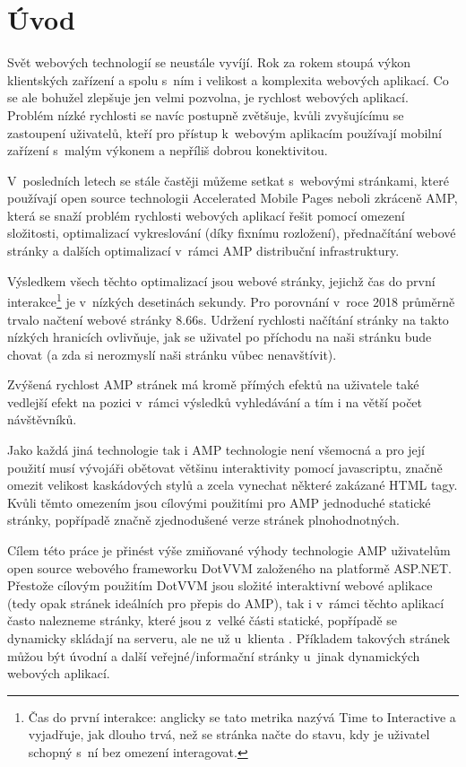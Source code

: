 \chapter{Úvod}

Svět webových technologií se neustále vyvíjí. Rok za rokem stoupá výkon klientských zařízení a spolu
s~ním i velikost a komplexita webových aplikací. Co se ale bohužel zlepšuje jen velmi pozvolna, je rychlost
webových aplikací. Problém nízké rychlosti se navíc postupně zvětšuje, kvůli zvyšujícímu se zastoupení
uživatelů, kteří pro přístup k~webovým aplikacím používají mobilní zařízení s~malým výkonem a nepříliš
dobrou konektivitou.

V~posledních letech se stále častěji můžeme setkat s~webovými stránkami, které používají open source technologii Accelerated Mobile Pages neboli zkráceně AMP, která se snaží problém rychlosti webových aplikací
řešit pomocí omezení složitosti, optimalizací vykreslování (díky fixnímu rozložení), přednačítání webové
stránky a dalších optimalizací v~rámci AMP distribuční infrastruktury.

Výsledkem všech těchto optimalizací jsou webové stránky, jejichž čas do první interakce\footnote{Čas do první interakce: anglicky se tato metrika nazývá Time to Interactive a vyjadřuje, jak dlouho trvá, než se stránka načte do stavu, kdy je uživatel schopný s~ní bez omezení interagovat.} je v~nízkých desetinách sekundy. Pro porovnání v~roce 2018 průměrně trvalo načtení webové
stránky 8.66s\cite{TTI}.
Udržení rychlosti načítání stránky na takto nízkých hranicích ovlivňuje, jak se uživatel po příchodu na naši
stránku bude chovat (a zda si nerozmyslí naši stránku vůbec nenavštívit).

Zvýšená rychlost AMP stránek má kromě přímých efektů na uživatele také vedlejší efekt na pozici
v~rámci výsledků vyhledávání a tím i na větší počet návštěvníků.

Jako každá jiná technologie tak i AMP technologie není všemocná a pro její použití musí vývojáři
obětovat většinu interaktivity pomocí javascriptu, značně omezit velikost kaskádových stylů a zcela
vynechat některé zakázané HTML tagy. Kvůli těmto omezením jsou cílovými použitími pro AMP jednoduché statické stránky, popřípadě značně
zjednodušené verze stránek plnohodnotných.

Cílem této práce je přinést výše zmiňované výhody technologie AMP uživatelům open source webového
frameworku DotVVM založeného na platformě ASP.NET.
Přestože cílovým použitím DotVVM jsou složité interaktivní webové aplikace (tedy opak stránek ideálních pro přepis do AMP), tak i v~rámci těchto aplikací často nalezneme stránky, které jsou z~velké části statické, popřípadě se dynamicky skládají na serveru, ale ne už u~klienta \cite{DotVVMIntro}. Příkladem takových stránek můžou být úvodní a další veřejné/informační stránky u~jinak dynamických webových aplikací. 

